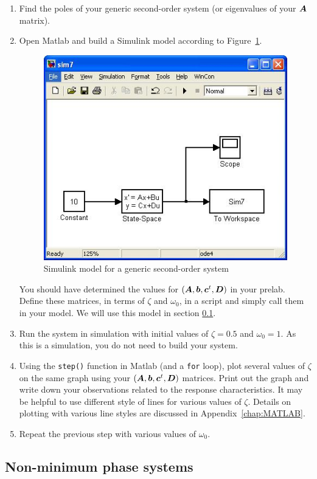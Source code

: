 \begin{enumerate}
\item Find the poles of your generic second-order system (or eigenvalues of your $\boldsymbol{A}$ matrix).
\item Open \textsf{Matlab} and build a \textsf{Simulink} model according to
Figure~\ref{fig:model7}\@.
\begin{figure}[htbp]
\centering
\includegraphics[width=0.6\hsize]{pix/model7.jpg}
\caption{\textsf{Simulink} model for a generic second-order system}\label{fig:model7}
\end{figure}%
You should have determined the values for
$(\boldsymbol{A},\boldsymbol{b},\boldsymbol{c}^{t},\boldsymbol{D})$ in your prelab. Define these matrices, in terms of $\zeta$ and $\omega_{0}$, in a script and simply call them in your model. We will use this model in section \ref{NMP}.

\item Run the system in simulation with initial values of $\zeta=0.5$ and
$\omega_{0}=1$\@. As this is a simulation, you do not need to build your system.

\item Using the \verb|step()| function in Matlab (and a \verb|for| loop), plot several values of $\zeta$ on the same graph using your $(\boldsymbol{A},\boldsymbol{b},\boldsymbol{c}^{t},\boldsymbol{D})$ matrices.
Print out the graph and write down your observations related to the response characteristics. It may be helpful to use different style of
lines for various values of $\zeta$. Details on plotting with various line
styles are discussed in Appendix~\ref{chap:MATLAB}\@.

\item Repeat the previous step with various values of $\omega_{0}$\@.
\end{enumerate}

\subsection{Non-minimum phase systems} \label{NMP}

